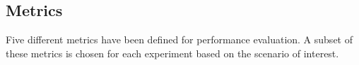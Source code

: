 %


\subsection{Metrics}

Five different metrics have been defined for performance evaluation. A subset of these metrics is chosen for each experiment based on the scenario of interest.%

